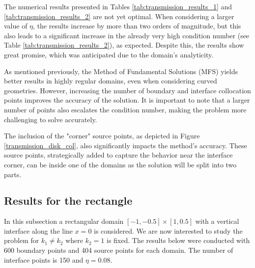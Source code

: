 The numerical results presented in Tables \ref{tab:transmission_results_1} and \ref{tab:transmission_results_2} are not yet optimal. When considering a larger value of \(\eta\), the results increase by more than two orders of magnitude, but this also leads to a significant increase in the already very high condition number (see Table \ref{tab:transmission_results_2}), as expected. Despite this, the results show great promise, which was anticipated due to the domain's analyticity.

As mentioned previously, the Method of Fundamental Solutions (MFS) yields better results in highly regular domains, even when considering curved geometries. However, increasing the number of boundary and interface collocation points improves the accuracy of the solution. It is important to note that a larger number of points also escalates the condition number, making the problem more challenging to solve accurately.

The inclusion of the "corner" source points, as depicted in Figure \ref{transmission_disk_col}, also significantly impacts the method's accuracy. These source points, strategically added to capture the behavior near the interface corner, can be inside one of the domains as the solution will be split into two parts.

\subsection{Results for the rectangle}

In this subsection a rectangular domain \([-1, -0.5] \times [1, 0.5]\) with a vertical interface along the line \(x=0\) is considered. We are now interested to study the problem for \(k_1 \neq k_2\) where \(k_2=1\) is fixed. The results below were conducted with 600 boundary points and 404 source points for each domain. The number of interface points is 150 and \(\eta=0.08\).

